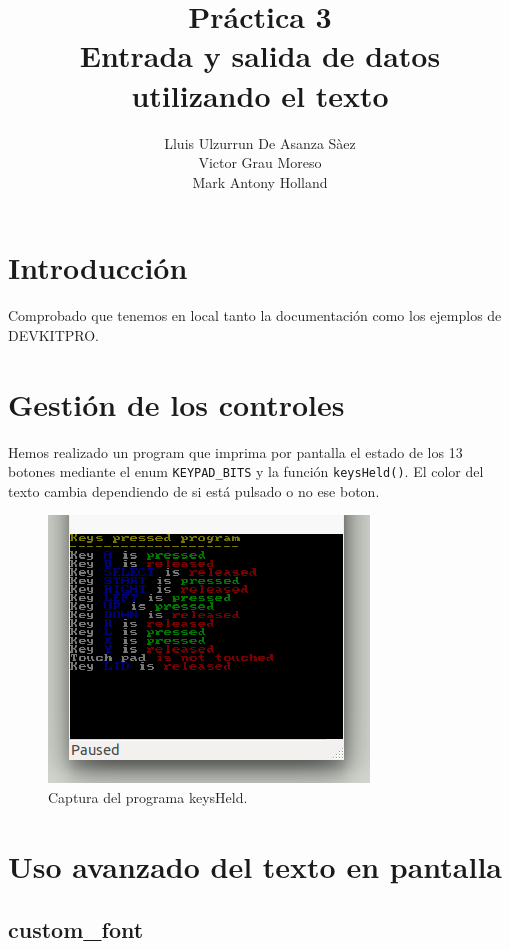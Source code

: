 \documentclass[12pt,english]{article}
\title{Práctica 3\\ Entrada y salida de datos utilizando el texto}
\author{Lluis Ulzurrun De Asanza Sàez\\Victor Grau Moreso \\Mark Antony Holland}
\date{}
\begin{document}
    \maketitle

    \tableofcontents

    \newpage
    
    \section{Introducción}

    Comprobado que tenemos en local tanto la documentación como los ejemplos de DEVKITPRO.

    \section{Gestión de los controles}

    Hemos realizado un program que imprima por pantalla el estado de los 13 botones mediante el enum \texttt{KEYPAD\_BITS} y la función \texttt{keysHeld()}. El color del texto cambia dependiendo de si está pulsado o no ese boton.
    
    \begin{figure}[H] 
    \centering
    \includegraphics[scale=0.5]{p3Media/keysHeld}
    \caption{Captura del programa keysHeld.}
    \end{figure}

    \newpage

    \section{Uso avanzado del texto en pantalla}

    \subsection{custom\_font}
\end{document}

